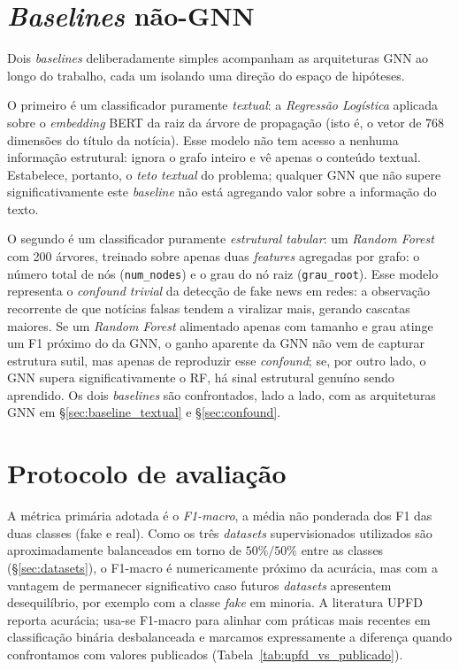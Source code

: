 \section{\emph{Baselines} n\~ao-GNN}
\label{sec:baselines}

Dois \emph{baselines} deliberadamente simples acompanham as arquiteturas
GNN ao longo do trabalho, cada um isolando uma dire\c{c}\~ao do espa\c{c}o
de hip\'oteses.

O primeiro \'e um classificador puramente \emph{textual}: a
\emph{Regress\~ao Log\'istica} aplicada sobre o \emph{embedding} BERT da
raiz da \'arvore de propaga\c{c}\~ao (isto \'e, o vetor de 768
dimens\~oes do t\'itulo da not\'icia). Esse modelo n\~ao tem acesso a
nenhuma informa\c{c}\~ao estrutural: ignora o grafo inteiro e v\^e apenas
o conte\'udo textual. Estabelece, portanto, o \emph{teto textual} do
problema; qualquer GNN que n\~ao supere significativamente este
\emph{baseline} n\~ao est\'a agregando valor sobre a informa\c{c}\~ao do
texto.

O segundo \'e um classificador puramente \emph{estrutural tabular}: um
\emph{Random Forest} com 200 \'arvores, treinado sobre apenas duas
\emph{features} agregadas por grafo: o n\'umero total de n\'os
(\texttt{num\_nodes}) e o grau do n\'o raiz (\texttt{grau\_root}). Esse
modelo representa o \emph{confound trivial} da detec\c{c}\~ao de fake news em
redes: a observa\c{c}\~ao recorrente de que not\'icias falsas tendem a
viralizar mais, gerando cascatas maiores. Se um \emph{Random Forest}
alimentado apenas com tamanho e grau atinge um F1 pr\'oximo do da GNN, o
ganho aparente da GNN n\~ao vem de capturar estrutura sutil, mas apenas
de reproduzir esse \emph{confound}; se, por outro lado, o GNN supera
significativamente o RF, h\'a sinal estrutural genu\'ino sendo aprendido.
Os dois \emph{baselines} s\~ao confrontados, lado a lado, com as
arquiteturas GNN em \S\ref{sec:baseline_textual} e \S\ref{sec:confound}.

\section{Protocolo de avalia\c{c}\~ao}
\label{sec:protocolo}

A m\'etrica prim\'aria adotada \'e o \emph{F1-macro}, a m\'edia n\~ao
ponderada dos F1 das duas classes (fake e real). Como os tr\^es
\emph{datasets} supervisionados utilizados s\~ao aproximadamente
balanceados em torno de $50\%/50\%$ entre as classes
(\S\ref{sec:datasets}), o F1-macro \'e numericamente pr\'oximo da
acur\'acia, mas com a vantagem de permanecer significativo caso futuros
\emph{datasets} apresentem desequil\'ibrio, por exemplo com a classe
\emph{fake} em minoria. A literatura UPFD~\cite{dou2021upfd}
reporta acur\'acia; usa-se F1-macro para alinhar com pr\'aticas mais
recentes em classifica\c{c}\~ao bin\'aria desbalanceada e marcamos
expressamente a diferen\c{c}a quando confrontamos com valores publicados
(Tabela~\ref{tab:upfd_vs_publicado}).

